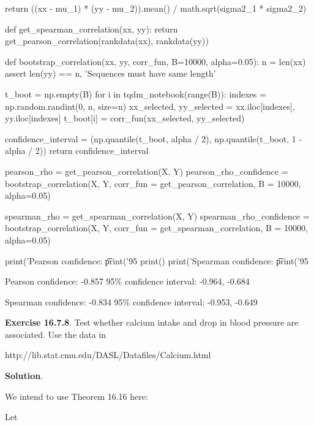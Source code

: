 {\begin{python}
    return ((xx - mu_1) * (yy - mu_2)).mean() / math.sqrt(sigma2_1 * sigma2_2)

def get_spearman_correlation(xx, yy):
    return get_pearson_correlation(rankdata(xx), rankdata(yy))

def bootstrap_correlation(xx, yy, corr_fun, B=10000, alpha=0.05):
    n = len(xx)
    assert len(yy) == n, 'Sequences must have same length'
    
    t_boot = np.empty(B)
    for i in tqdm_notebook(range(B)):
        indexes = np.random.randint(0, n, size=n)
        xx_selected, yy_selected = xx.iloc[indexes], yy.iloc[indexes]
        t_boot[i] = corr_fun(xx_selected, yy_selected)
        
    confidence_interval = (np.quantile(t_boot, alpha / 2), np.quantile(t_boot, 1 - alpha / 2))
    return confidence_interval
\end{python}

\begin{python}
pearson_rho = get_pearson_correlation(X, Y)
pearson_rho_confidence = bootstrap_correlation(X, Y, corr_fun = get_pearson_correlation, B = 10000, alpha=0.05)

spearman_rho = get_spearman_correlation(X, Y)
spearman_rho_confidence = bootstrap_correlation(X, Y, corr_fun = get_spearman_correlation, B = 10000, alpha=0.05)
\end{python}

\begin{python}
print('Pearson confidence: \t %
print('95%
print()
print('Spearman confidence: \t %
print('95%
\end{python}

\begin{console}
Pearson confidence:      -0.857
95\% confidence interval: -0.964, -0.684

Spearman confidence:     -0.834
95\% confidence interval: -0.953, -0.649
\end{console}

\textbf{Exercise 16.7.8}. Test whether calcium intake and drop in blood
pressure are associated. Use the data in

http://lib.stat.cmu.edu/DASL/Datafiles/Calcium.html

\textbf{Solution}.

We intend to use Theorem 16.16 here:

Let

}
